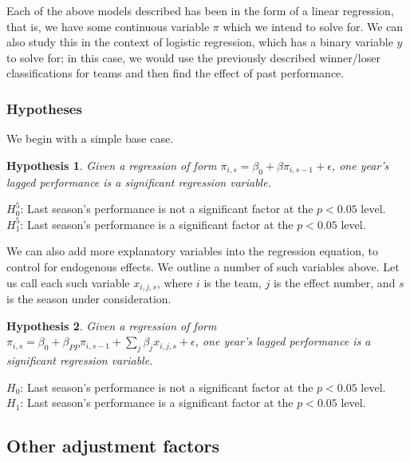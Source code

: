 \documentclass[11pt,]{article}
\newtheorem{hypothesis}{Hypothesis}
\begin{document}
Each of the above models described has been in the form of a linear
regression, that is, we have some continuous variable \(\pi\) which we
intend to solve for. We can also study this in the context of logistic
regression, which has a binary variable \(y\) to solve for; in this
case, we would use the previously described winner/loser classifications
for teams and then find the effect of past performance.

\subsubsection{Hypotheses}\label{hypotheses-1}

We begin with a simple base case.

\begin{framed}
\begin{hypothesis}
Given a regression of form $\pi_{i,s} = \beta_0 + \beta \pi_{i, s-1} + \epsilon$, one year's lagged performance is a significant regression variable.
\end{hypothesis}

\noindent $H_0^5$: Last season's performance is not a significant factor at the $p < 0.05$ level. \\
$H_1^5$: Last season's performance is a significant factor at the $p < 0.05$ level.
\end{framed}

We can also add more explanatory variables into the regression equation,
to control for endogenous effects. We outline a number of such variables
above. Let us call each such variable \(x_{i, j, s}\), where \(i\) is
the team, \(j\) is the effect number, and \(s\) is the season under
consideration.

\begin{framed}
\begin{hypothesis}
Given a regression of form $\pi_{i,s} = \beta_0 + \beta_{PP} \pi_{i, s-1} + \sum_{j}\beta_j x_{i, j, s} + \epsilon$, one year's lagged performance is a significant regression variable.
\end{hypothesis}

\noindent $H_0$: Last season's performance is not a significant factor at the $p < 0.05$ level. \\
$H_1$: Last season's performance is a significant factor at the $p < 0.05$ level.
\end{framed}

\subsection{Other adjustment factors}\label{other-adjustment-factors}
\end{document}
